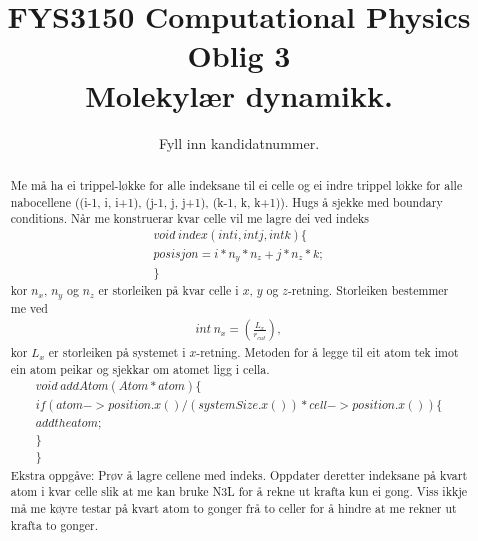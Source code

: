 \documentclass[11pt, a4paper]{article}
\theoremstyle{definition}
\begin{document}
\begin{titlepage}

  \title{\normalsize FYS3150 Computational Physics\\
  \vspace{10mm}
  \huge Oblig 3\\
  \vspace{10mm}
  \normalsize{\bf Molekylær dynamikk.}}

  \author{Fyll inn kandidatnummer.}

\end{titlepage}

\maketitle

\begin{abstract}
  Me må ha ei trippel-løkke for alle indeksane til ei celle og ei indre trippel løkke for alle nabocellene ((i-1, i, i+1), (j-1, j, j+1), (k-1, k, k+1)). 
  Hugs å sjekke med boundary conditions.
  Når me konstruerar kvar celle vil me lagre dei ved indeks
  \begin{align*}
    void \ index(int i, int j, int k) \{ \\
      posisjon = i * n_y * n_z + j * n_z * k; \\
    \}
  \end{align*}
  kor $n_x$, $n_y$ og $n_z$ er storleiken på kvar celle i $x$, $y$ og $z$-retning.
  Storleiken bestemmer me ved
  \begin{align*}
    int \ n_x = \left( \frac{L_x}{r_{cut}} \right),
  \end{align*}
  kor $L_x$ er storleiken på systemet i $x$-retning.
  Metoden for å legge til eit atom tek imot ein atom peikar og sjekkar om atomet ligg i cella.
  \begin{align*}
    void \ addAtom(Atom *atom) \{ \\
      if (atom->position.x() / (systemSize.x()) * cell->position.x()) \{ \\
        add the atom; \\
      \} \\
    \}
  \end{align*}
  Ekstra oppgåve: Prøv å lagre cellene med indeks. Oppdater deretter indeksane på kvart atom i kvar celle slik at me kan bruke N3L for å rekne ut krafta kun ei gong. Viss ikkje 
  må me køyre testar på kvart atom to gonger frå to celler for å hindre at me rekner ut krafta to gonger.
\end{abstract}
\end{document}
